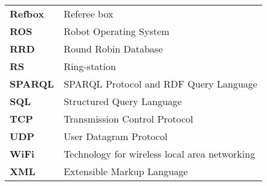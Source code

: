 \begin{tabular}{ll}
\textbf{Refbox} &  Referee box \\
\textbf{ROS} &  Robot Operating System \\
\textbf{RRD} &  Round Robin Database \\
\textbf{RS} &  Ring-station \\
\textbf{SPARQL} & SPARQL Protocol and RDF Query Language \\
\textbf{SQL} & Structured Query Language \\
\textbf{TCP} & Transmission Control Protocol \\
\textbf{UDP} & User Datagram Protocol \\
\textbf{WiFi} & Technology for wireless local area networking \\
\textbf{XML} & Extensible Markup Language
\end{tabular}

